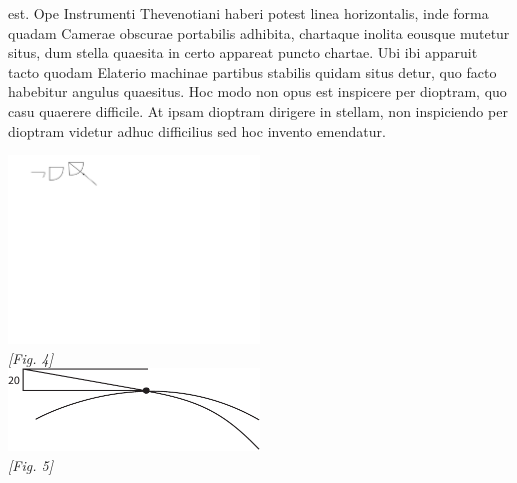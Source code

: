             est. \newline Ope Instrumenti Thevenotiani  haberi potest linea horizontalis, inde forma quadam Camerae obscurae\protect{} portabilis adhibita, chartaque inolita eousque mutetur situs,  dum stella  quaesita in certo appareat puncto  chartae. Ubi ibi apparuit tacto  quodam Elaterio machinae partibus  stabilis quidam situs detur, quo facto habebitur angulus quaesitus. Hoc modo non opus est inspicere per dioptram\protect{}, quo casu quaerere  difficile. At ipsam dioptram\protect{} dirigere in stellam, non  inspiciendo per dioptram\protect{} videtur adhuc difficilius sed  hoc invento emendatur.\pend \vspace{10mm}           
              \begin{center}
              \includegraphics[width=0.5\textwidth]{images/38_22r456}
              \\  \textit{[Fig. 4]} \vspace{5mm}
              \\
              \includegraphics[width=0.5\textwidth]{images/38_22r7}
              \\ \textit{[Fig. 5]}
              \end{center}